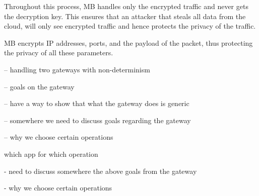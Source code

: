 Throughout this process, MB handles only the encrypted traffic and never gets the decryption key. This ensures
that an attacker that steals all data from the cloud, will only see encrypted traffic and hence protects the privacy of the 
traffic. 

MB encrypts IP addresses, ports, and the payload of the packet, thus protecting the privacy of all these parameters. 





-- handling two gateways with non-determinism




-- goals on the gateway

-- have a way to show that what the gateway does is generic 
   
-- somewhere we need to discuss goals regarding the gateway

-- why we choose certain operations

which app for which operation


- need to discuss somewhere the above goals from the gateway


- why we choose certain operations

